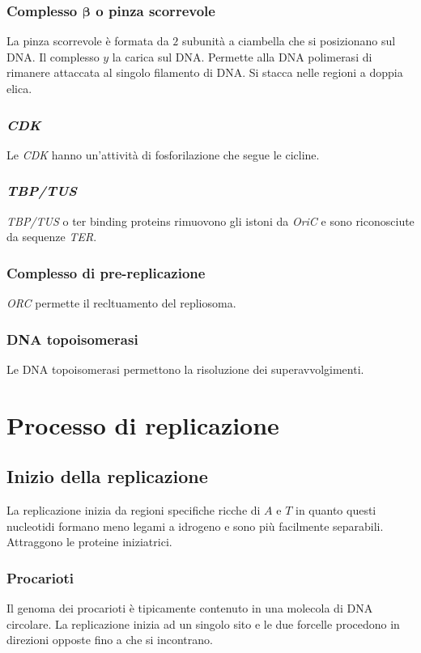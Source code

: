 		\subsubsection{Complesso $\mathbf{\beta}$ o pinza scorrevole}
		La pinza scorrevole \`e formata da $2$ subunit\`a a ciambella che si posizionano sul DNA.
		Il complesso $y$ la carica sul DNA.
		Permette alla DNA polimerasi di rimanere attaccata al singolo filamento di DNA.
		Si stacca nelle regioni a doppia elica.

		\subsubsection{\emph{CDK}}
		Le \emph{CDK} hanno un'attivit\`a di fosforilazione che segue le cicline.

		\subsubsection{\emph{TBP/TUS}}
		\emph{TBP/TUS} o ter binding proteins rimuovono gli istoni da \emph{OriC} e sono riconosciute da sequenze \emph{TER}.

		\subsubsection{Complesso di pre-replicazione}
		\emph{ORC} permette il recltuamento del repliosoma.

		\subsubsection{DNA topoisomerasi}
		Le DNA topoisomerasi permettono la risoluzione dei superavvolgimenti.

\section{Processo di replicazione}

	\subsection{Inizio della replicazione}
	La replicazione inizia da regioni specifiche ricche di $A$ e $T$ in quanto questi nucleotidi formano meno legami a idrogeno e sono pi\`u facilmente separabili.
	Attraggono le proteine iniziatrici.

		\subsubsection{Procarioti}
		Il genoma dei procarioti \`e tipicamente contenuto in una molecola di DNA circolare.
		La replicazione inizia ad un singolo sito e le due forcelle procedono in direzioni opposte fino a che si incontrano.
		
